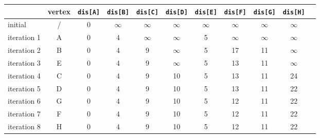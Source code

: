 \begin{table}[htbp]
    \begin{center}
        \begin{tabular}{|l|c|c|c|c|c|c|c|c|c| p{3cm}|}
            \hline
                        & vertex & \texttt{dis[A]} & \texttt{dis[B]} & \texttt{dis[C]} & \texttt{dis[D]} & \texttt{dis[E]} & \texttt{dis[F]} & \texttt{dis[G]} & \texttt{dis[H]} \\ \hline
            initial     & /      & 0               & $\infty$        & $\infty$        & $\infty$        & $\infty$        & $\infty$        & $\infty$        & $\infty$        \\ \hline
            iteration 1 & A      & 0               & 4               & $\infty$        & $\infty$        & 5               & $\infty$        & $\infty$        & $\infty$        \\ \hline
            iteration 2 & B      & 0               & 4               & 9               & $\infty$        & 5               & 17              & 11              & $\infty$        \\ \hline
            iteration 3 & E      & 0               & 4               & 9               & $\infty$        & 5               & 13              & 11              & $\infty$        \\ \hline
            iteration 4 & C      & 0               & 4               & 9               & 10              & 5               & 13              & 11              & 24              \\ \hline
            iteration 5 & D      & 0               & 4               & 9               & 10              & 5               & 13              & 11              & 22              \\ \hline
            iteration 6 & G      & 0               & 4               & 9               & 10              & 5               & 12              & 11              & 22              \\ \hline
            iteration 7 & F      & 0               & 4               & 9               & 10              & 5               & 12              & 11              & 22              \\ \hline
            iteration 8 & H      & 0               & 4               & 9               & 10              & 5               & 12              & 11              & 22              \\ \hline
        \end{tabular}
    \end{center}
\end{table}

